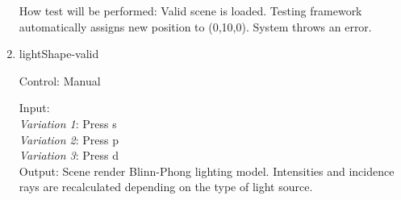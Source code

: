 \documentclass[12pt, titlepage]{article}
\begin{document}
\begin{enumerate}
	How test will be performed: Valid scene is loaded. Testing framework 
	automatically assigns new position to (0,10,0). System throws an error.
	
%	
%	
%		

%	
%	
%	
%	
%	


	\item[\label{test:lightShape}]{lightShape-valid\\}
	
	Control: Manual
	
	Input: \\
	\textit{Variation 1}: Press s\\
	\textit{Variation 2}: Press p\\
	\textit{Variation 3}: Press d\\
	
	Output: Scene render Blinn-Phong lighting model. Intensities and incidence 
	rays are recalculated depending on the type of light source.


\end{enumerate}
\end{document}
